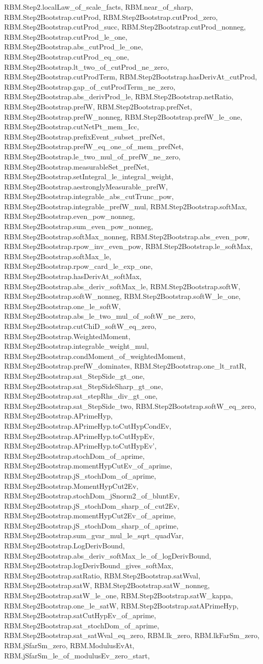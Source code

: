 \begin{theorem}
RBM.Step2.localLaw_of_scale_facts, RBM.near_of_sharp, RBM.Step2Bootstrap.cutProd, RBM.Step2Bootstrap.cutProd_zero, RBM.Step2Bootstrap.cutProd_succ, RBM.Step2Bootstrap.cutProd_nonneg, RBM.Step2Bootstrap.cutProd_le_one, RBM.Step2Bootstrap.abs_cutProd_le_one, RBM.Step2Bootstrap.cutProd_eq_one, RBM.Step2Bootstrap.lt_two_of_cutProd_ne_zero, RBM.Step2Bootstrap.cutProdTerm, RBM.Step2Bootstrap.hasDerivAt_cutProd, RBM.Step2Bootstrap.gap_of_cutProdTerm_ne_zero, RBM.Step2Bootstrap.abs_derivProd_le, RBM.Step2Bootstrap.netRatio, RBM.Step2Bootstrap.prefW, RBM.Step2Bootstrap.prefNet, RBM.Step2Bootstrap.prefW_nonneg, RBM.Step2Bootstrap.prefW_le_one, RBM.Step2Bootstrap.cutNetPt_mem_Icc, RBM.Step2Bootstrap.prefixEvent_subset_prefNet, RBM.Step2Bootstrap.prefW_eq_one_of_mem_prefNet, RBM.Step2Bootstrap.le_two_mul_of_prefW_ne_zero, RBM.Step2Bootstrap.measurableSet_prefNet, RBM.Step2Bootstrap.setIntegral_le_integral_weight, RBM.Step2Bootstrap.aestronglyMeasurable_prefW, RBM.Step2Bootstrap.integrable_abs_cutTrunc_pow, RBM.Step2Bootstrap.integrable_prefW_mul, RBM.Step2Bootstrap.softMax, RBM.Step2Bootstrap.even_pow_nonneg, RBM.Step2Bootstrap.sum_even_pow_nonneg, RBM.Step2Bootstrap.softMax_nonneg, RBM.Step2Bootstrap.abs_even_pow, RBM.Step2Bootstrap.rpow_inv_even_pow, RBM.Step2Bootstrap.le_softMax, RBM.Step2Bootstrap.softMax_le, RBM.Step2Bootstrap.rpow_card_le_exp_one, RBM.Step2Bootstrap.hasDerivAt_softMax, RBM.Step2Bootstrap.abs_deriv_softMax_le, RBM.Step2Bootstrap.softW, RBM.Step2Bootstrap.softW_nonneg, RBM.Step2Bootstrap.softW_le_one, RBM.Step2Bootstrap.one_le_softW, RBM.Step2Bootstrap.abs_le_two_mul_of_softW_ne_zero, RBM.Step2Bootstrap.cutChiD_softW_eq_zero, RBM.Step2Bootstrap.WeightedMoment, RBM.Step2Bootstrap.integrable_weight_mul, RBM.Step2Bootstrap.condMoment_of_weightedMoment, RBM.Step2Bootstrap.prefW_dominates, RBM.Step2Bootstrap.one_lt_ratR, RBM.Step2Bootstrap.sat_StepSide_gt_one, RBM.Step2Bootstrap.sat_StepSideSharp_gt_one, RBM.Step2Bootstrap.sat_stepRhs_div_gt_one, RBM.Step2Bootstrap.sat_StepSide_two, RBM.Step2Bootstrap.softW_eq_zero, RBM.Step2Bootstrap.APrimeHyp, RBM.Step2Bootstrap.APrimeHyp.toCutHypCondEv, RBM.Step2Bootstrap.APrimeHyp.toCutHypEv, RBM.Step2Bootstrap.APrimeHyp.toCutHypEv', RBM.Step2Bootstrap.stochDom_of_aprime, RBM.Step2Bootstrap.momentHypCutEv_of_aprime, RBM.Step2Bootstrap.jS_stochDom_of_aprime, RBM.Step2Bootstrap.MomentHypCut2Ev, RBM.Step2Bootstrap.stochDom_jSnorm2_of_bluntEv, RBM.Step2Bootstrap.jS_stochDom_sharp_of_cut2Ev, RBM.Step2Bootstrap.momentHypCut2Ev_of_aprime, RBM.Step2Bootstrap.jS_stochDom_sharp_of_aprime, RBM.Step2Bootstrap.sum_gvar_mul_le_sqrt_quadVar, RBM.Step2Bootstrap.LogDerivBound, RBM.Step2Bootstrap.abs_deriv_softMax_le_of_logDerivBound, RBM.Step2Bootstrap.logDerivBound_gives_softMax, RBM.Step2Bootstrap.satRatio, RBM.Step2Bootstrap.satWval, RBM.Step2Bootstrap.satW, RBM.Step2Bootstrap.satW_nonneg, RBM.Step2Bootstrap.satW_le_one, RBM.Step2Bootstrap.satW_kappa, RBM.Step2Bootstrap.one_le_satW, RBM.Step2Bootstrap.satAPrimeHyp, RBM.Step2Bootstrap.satCutHypEv_of_aprime, RBM.Step2Bootstrap.sat_stochDom_of_aprime, RBM.Step2Bootstrap.sat_satWval_eq_zero, RBM.lk_zero, RBM.lkFarSm_zero, RBM.jSfarSm_zero, RBM.ModulusEvAt, RBM.jSfarSm_le_of_modulusEv_zero_start, 
\end{theorem}
